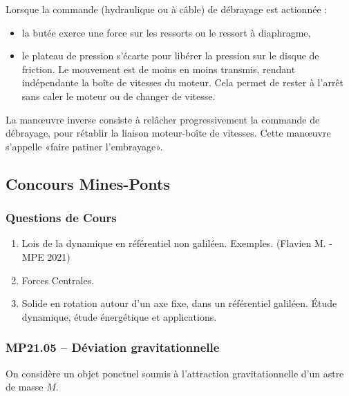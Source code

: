 \begin{center}
\end{center}

Lorsque la commande (hydraulique ou à câble) de débrayage est actionnée :
\begin{itemize}
\item la butée exerce une force sur les ressorts ou le ressort à diaphragme,
\item le plateau de pression s'écarte pour libérer la pression sur le disque de friction. Le mouvement est de moins en moins transmis, rendant indépendante la boîte de vitesses du moteur. Cela permet de rester à l'arrêt sans caler le moteur ou de changer de vitesse.
\end{itemize}

La manœuvre inverse consiste à relâcher progressivement la commande de débrayage, pour rétablir la liaison moteur-boîte de vitesses. Cette manœuvre s'appelle «faire patiner l'embrayage».

\newpage
\subsection*{Concours Mines-Ponts}
\subsubsection*{Questions de Cours}

\begin{enumerate}
    \item Lois de la dynamique en référentiel non galiléen. Exemples. (Flavien M. - MPE 2021)
    \item Forces Centrales.
    \item Solide en rotation autour d'un axe fixe, dans un référentiel galiléen. Étude dynamique, étude énergétique et applications.
\end{enumerate}

\subsubsection*{MP21.05 -- Déviation gravitationnelle  \corrige}

On considère un objet ponctuel soumis à l'attraction gravitationnelle d'un astre de masse $M$.

